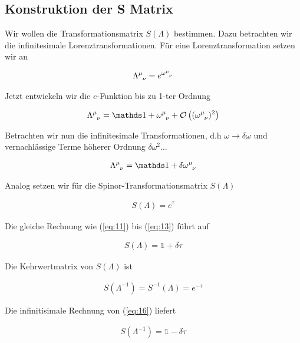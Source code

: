 \subsection*{Konstruktion der S Matrix}

Wir wollen die Transformationsmatrix \(S(\Lambda)\) bestimmen. Dazu betrachten wir die infinitesimale Lorenztransformationen. Für eine Lorenztransformation setzen wir an

\begin{align}
  \label{eq:11}
  \Lambda^{\mu}_{\hphantom\mu \nu} = e^{\omega^\mu_{\hphantom\mu \nu}}
\end{align}

Jetzt entwickeln wir die \(e\)-Funktion bis zu 1-ter Ordnung

\begin{align}
  \label{eq:12}
  \Lambda^{\mu}_{\hphantom\mu \nu} = \mathds 1 + \omega^\mu_{\hphantom\mu \nu} + \mathcal O\left((\omega^\mu_{\hphantom\mu \nu})^2\right)
\end{align}

Betrachten wir nun die infinitesimale Transformationen, d.h \(\omega \rightarrow \delta\omega\) und vernachlässige Terme höherer Ordnung \(\delta\omega^2\dots\)

\begin{align}
  \label{eq:13}
  \Lambda^{\mu}_{\hphantom\mu \nu} = \mathds 1 + \delta\omega^\mu_{\hphantom\mu \nu}
\end{align}

Analog setzen wir für die Spinor-Transformationsmatrix \(S(\Lambda)\)

\begin{align}
  \label{eq:14}
  S(\Lambda) = e^{\tau} 
\end{align}

Die gleiche Rechnung wie (\ref{eq:11}) bis (\ref{eq:13}) führt auf

\begin{align}
  \label{eq:15}
  S(\Lambda) = \mathds 1 + \delta\tau
\end{align}

Die Kehrwertmatrix von \(S(\Lambda)\) ist

\begin{align}
  \label{eq:16}
  S(\Lambda^{-1}) = S^{-1}(\Lambda) = e^{-\tau}
\end{align}

Die infinitisimale Rechnung von (\ref{eq:16}) liefert

\begin{align}
  \label{eq:17}
   S(\Lambda^{-1}) = \mathds 1 - \delta\tau
\end{align}

